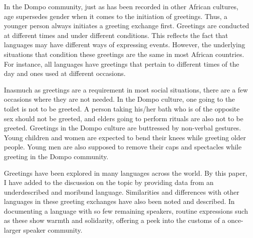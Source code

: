 \documentclass[output=paper,colorlinks,citecolor=brown]{langscibook}
\begin{document}
In the Dompo community, just as has been recorded in other African cultures, age supersedes gender when it comes to the initiation of greetings. Thus, a younger person always initiates a greeting exchange first. Greetings are conducted at different times and under different conditions. This reflects the fact that languages may have different ways of expressing events. However, the underlying situations that condition these greetings are the same in most African countries. For instance, all languages have greetings that pertain to different times of the day and ones used at different occasions. 

Inasmuch as greetings are a requirement in most social situations, there are a few occasions where they are not  needed. In the Dompo culture, one going to the toilet is not to be greeted. A person taking his/her bath who is of the opposite sex should not be greeted, and elders going to perform rituals are also not to be greeted. Greetings in the Dompo culture are buttressed by  non-verbal gestures. Young children and women are expected to bend their knees while greeting older people. Young men are also supposed to remove their caps and spectacles while greeting in the Dompo community.

Greetings have been explored in many languages across the world. By this paper, I have added to the discussion on the topic by providing data from an underdescribed and moribund language. Similarities and differences with other languages in these greeting exchanges have also been noted and described. In documenting a language with so few remaining speakers, routine expressions such as these show warmth and solidarity, offering a peek into the customs of a once-larger speaker community.
\end{document}
